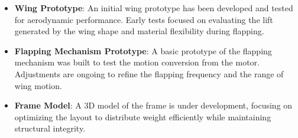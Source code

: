 \begin{itemize}
    \item \textbf{Wing Prototype}: An initial wing prototype has been developed and tested for aerodynamic performance. Early tests focused on evaluating the lift generated by the wing shape and material flexibility during flapping.
    
    \item \textbf{Flapping Mechanism Prototype}: A basic prototype of the flapping mechanism was built to test the motion conversion from the \bldc motor. Adjustments are ongoing to refine the flapping frequency and the range of wing motion.
    
    \item \textbf{Frame Model}: A 3D model of the frame is under development, focusing on optimizing the layout to distribute weight efficiently while maintaining structural integrity.
\end{itemize}
